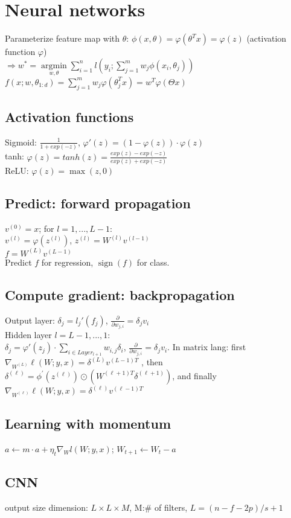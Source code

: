 \section*{Neural networks}
Parameterize feature map with $\theta$: $\phi(x,\theta) = \varphi(\theta^T x) = \varphi(z)$ (activation function $\varphi$)\\
$\Rightarrow w^* = \underset{w, \theta}{\operatorname{argmin}} \sum_{i=1}^n l(y_i; \sum_{j=1}^m w_j \phi(x_i, \theta_j))$\\
$f(x; w, \theta_{1:d}) = \sum_{j=1}^m w_j \varphi(\theta_j^T x) = w^T \varphi(\Theta x)$

\subsection*{Activation functions}
Sigmoid: $\frac{1}{1+exp(-z)}$,  $\varphi'(z) = (1 - \varphi(z))\cdot\varphi(z)$\\
tanh: $\varphi(z) = tanh(z) = \frac{exp(z)-exp(-z)}{exp(z)+exp(-z)}$\\
ReLU:  $\varphi(z) = \max(z,0)$

\subsection*{Predict: forward propagation}
$v^{(0)} = x$; for $l = 1,...,L-1$: \\
$v^{(l)} = \varphi(z^{(l)})$, $z^{(l)} = W^{(l)}v^{(l-1)}$\\
$f = W^{(L)}v^{(L-1)}$\\
Predict $f$ for regression, $\operatorname{sign}(f)$ for class.

\subsection*{Compute gradient: backpropagation}
Output layer: 
$\delta_j = l_j'(f_j)$,
$\frac{\partial}{\partial w_{j,i}} = \delta_j v_i$\\
Hidden layer $l=L-1,...,1$:\\
$\delta_j = \varphi'(z_j) \cdot \sum_{i\in Layer_{l+1}} w_{i,j}\delta_i$,
$\frac{\partial}{\partial w_{j,i}} = \delta_j v_i$. In matrix lang: first $\nabla_{W^{(L)}} \ell(W; y,x) = \delta^{(L)} v^{(L - 1)T}$
, then  $\delta^{(\ell)} = \phi^{'} (z^{(\ell)}) \odot (W^{(\ell + 1)T} \delta^{(\ell+1)})$, and finally $\nabla_{W^{(\ell)}} \ell(W; y,x) = \delta^{(\ell)} v^{(\ell - 1)T}$

\subsection*{Learning with momentum}
$a \leftarrow m \cdot a + \eta_t \nabla_W l(W;y,x)$; $W_{t+1} \leftarrow W_t - a$

\subsection*{CNN}
output size dimension: $L\times L \times M$, M:$\#$ of filters, $L = (n - f - 2p)/s + 1$

